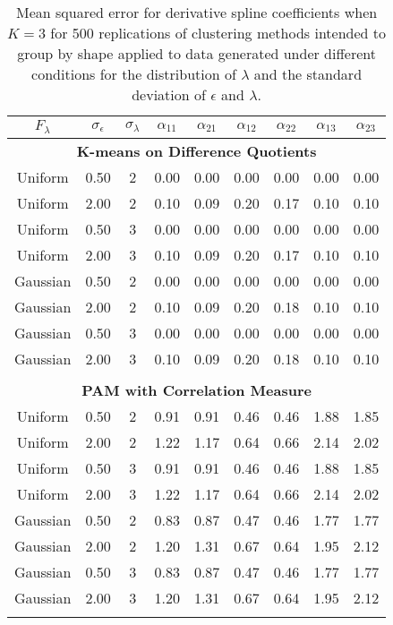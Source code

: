 \begin{table}[ht]
\centering
\begin{tabular}{ccc|cccccc}
  \thickhline $F_{\lambda}$&$\sigma_{\epsilon}$&$\sigma_{\lambda}$&$\alpha_{11}$&$\alpha_{21}$&$\alpha_{12}$&$\alpha_{22}$&$\alpha_{13}$&$\alpha_{23}$\\  \hline\multicolumn{9}{c}{\textbf{K-means on Difference Quotients}}\\ Uniform & 0.50 &   2 & 0.00 & 0.00 & 0.00 & 0.00 & 0.00 & 0.00 \\ 
  Uniform & 2.00 &   2 & 0.10 & 0.09 & 0.20 & 0.17 & 0.10 & 0.10 \\ 
  Uniform & 0.50 &   3 & 0.00 & 0.00 & 0.00 & 0.00 & 0.00 & 0.00 \\ 
  Uniform & 2.00 &   3 & 0.10 & 0.09 & 0.20 & 0.17 & 0.10 & 0.10 \\ 
  Gaussian & 0.50 &   2 & 0.00 & 0.00 & 0.00 & 0.00 & 0.00 & 0.00 \\ 
  Gaussian & 2.00 &   2 & 0.10 & 0.09 & 0.20 & 0.18 & 0.10 & 0.10 \\ 
  Gaussian & 0.50 &   3 & 0.00 & 0.00 & 0.00 & 0.00 & 0.00 & 0.00 \\ 
  Gaussian & 2.00 &   3 & 0.10 & 0.09 & 0.20 & 0.18 & 0.10 & 0.10 \\ 
   \\ \multicolumn{9}{c}{\textbf{PAM with Correlation Measure}}\\Uniform & 0.50 &   2 & 0.91 & 0.91 & 0.46 & 0.46 & 1.88 & 1.85 \\ 
  Uniform & 2.00 &   2 & 1.22 & 1.17 & 0.64 & 0.66 & 2.14 & 2.02 \\ 
  Uniform & 0.50 &   3 & 0.91 & 0.91 & 0.46 & 0.46 & 1.88 & 1.85 \\ 
  Uniform & 2.00 &   3 & 1.22 & 1.17 & 0.64 & 0.66 & 2.14 & 2.02 \\ 
  Gaussian & 0.50 &   2 & 0.83 & 0.87 & 0.47 & 0.46 & 1.77 & 1.77 \\ 
  Gaussian & 2.00 &   2 & 1.20 & 1.31 & 0.67 & 0.64 & 1.95 & 2.12 \\ 
  Gaussian & 0.50 &   3 & 0.83 & 0.87 & 0.47 & 0.46 & 1.77 & 1.77 \\ 
  Gaussian & 2.00 &   3 & 1.20 & 1.31 & 0.67 & 0.64 & 1.95 & 2.12 \\ 
   \thickhline\end{tabular}
\caption{Mean squared error for derivative spline coefficients when $K=3$ for 500 replications of clustering methods intended to group by shape applied to data generated under different conditions for the distribution of $\lambda$ and the standard deviation of $\epsilon$ and $\lambda$.}
\label{tab:mse2}

\end{table}
